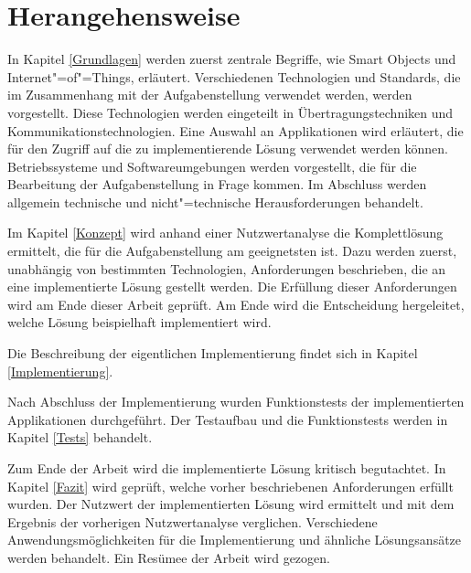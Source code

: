 \section{Herangehensweise}

In Kapitel \ref{Grundlagen} werden zuerst zentrale Begriffe, wie Smart Objects und Internet"=of"=Things, erläutert. Verschiedenen Technologien und Standards, die im Zusammenhang mit der Aufgabenstellung verwendet werden, werden vorgestellt. Diese Technologien werden eingeteilt in Übertragungstechniken und Kommunikationstechnologien. Eine Auswahl an Applikationen wird erläutert, die für den Zugriff auf die zu implementierende Lösung verwendet werden können. Betriebssysteme und Softwareumgebungen werden vorgestellt, die für die Bearbeitung der Aufgabenstellung in Frage kommen. Im Abschluss werden allgemein technische und nicht"=technische Herausforderungen behandelt.

Im Kapitel \ref{Konzept} wird anhand einer Nutzwertanalyse die Komplettlösung ermittelt, die für die Aufgabenstellung am geeignetsten ist.  Dazu werden zuerst, unabhängig von bestimmten Technologien, Anforderungen beschrieben, die an eine implementierte Lösung gestellt werden. Die Erfüllung dieser Anforderungen wird am Ende dieser Arbeit geprüft.  Am Ende wird die Entscheidung hergeleitet, welche Lösung beispielhaft implementiert wird.

Die Beschreibung der eigentlichen Implementierung findet sich in Kapitel \ref{Implementierung}.

Nach Abschluss der Implementierung wurden Funktionstests der implementierten Applikationen durchgeführt. Der Testaufbau und die Funktionstests werden in Kapitel \ref{Tests} behandelt.

Zum Ende der Arbeit wird die implementierte Lösung kritisch begutachtet. In Kapitel \ref{Fazit} wird geprüft, welche vorher beschriebenen Anforderungen erfüllt wurden. Der Nutzwert der implementierten Lösung wird ermittelt und mit dem Ergebnis der vorherigen Nutzwertanalyse verglichen. Verschiedene Anwendungsmöglichkeiten für die Implementierung und ähnliche Lösungsansätze werden behandelt. Ein Resümee der Arbeit wird gezogen.





